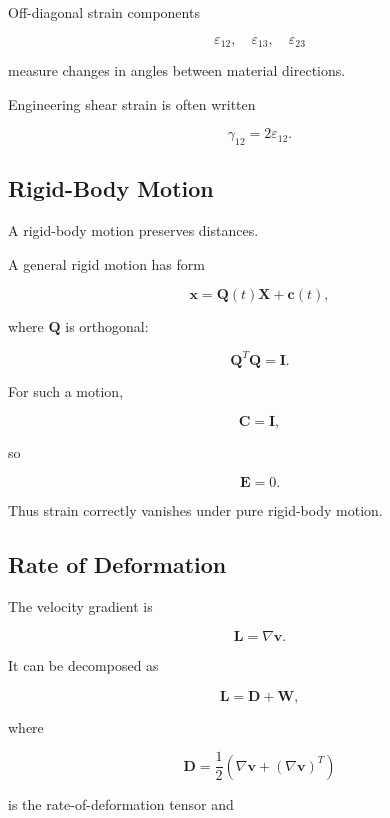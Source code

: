 Off-diagonal strain components

\[
\boxed{
\varepsilon_{12},
\quad
\varepsilon_{13},
\quad
\varepsilon_{23}
}
\]

measure changes in angles between material directions.

Engineering shear strain is often written

\[
\boxed{
\gamma_{12}
=
2\varepsilon_{12}.
}
\]

\subsection{Rigid-Body Motion}
\label{subsec:rigid-body-motion-continuum}

A rigid-body motion preserves distances.

A general rigid motion has form

\[
\boxed{
\mathbf{x}
=
\mathbf{Q}(t)\mathbf{X}
+
\mathbf{c}(t),
}
\]

where \(\mathbf{Q}\) is orthogonal:

\[
\boxed{
\mathbf{Q}^{T}\mathbf{Q}
=
\mathbf{I}.
}
\]

For such a motion,

\[
\mathbf{C}
=
\mathbf{I},
\]

so

\[
\boxed{
\mathbf{E}=0.
}
\]

Thus strain correctly vanishes under pure rigid-body motion.

\subsection{Rate of Deformation}
\label{subsec:rate-of-deformation}

The velocity gradient is

\[
\boxed{
\mathbf{L}
=
\nabla\mathbf{v}.
}
\]

It can be decomposed as

\[
\boxed{
\mathbf{L}
=
\mathbf{D}
+
\mathbf{W},
}
\]

where

\[
\boxed{
\mathbf{D}
=
\frac12
\left(
\nabla\mathbf{v}
+
(\nabla\mathbf{v})^T
\right)
}
\]

is the rate-of-deformation tensor and

